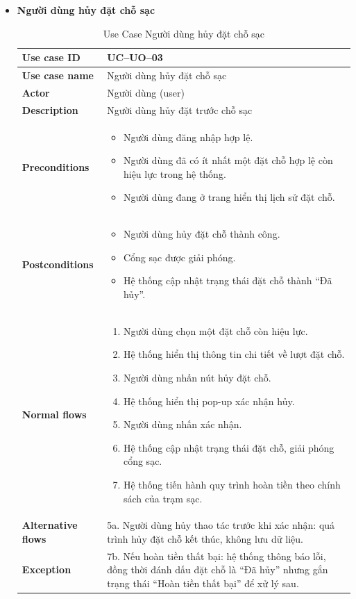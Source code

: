 \begin{itemize}
\item \textbf{Người dùng hủy đặt chỗ sạc}
\begin{longtable}{|m{}|m{}|}
          \caption{Use Case Người dùng hủy đặt chỗ sạc} \\
  \hline
  \textbf{Use case ID} & UC--UO--03 \\
  \hline
  \textbf{Use case name} & Người dùng hủy đặt chỗ sạc \\
  \hline
  \textbf{Actor} & Người dùng (user) \\
  \hline
  \textbf{Description} & Người dùng hủy đặt trước chỗ sạc \\
  \hline
  \textbf{Preconditions} &
  \begin{itemize}
    \item Người dùng đăng nhập hợp lệ.
    \item Người dùng đã có ít nhất một đặt chỗ hợp lệ còn hiệu lực trong hệ thống.
    \item Người dùng đang ở trang hiển thị lịch sử đặt chỗ.
  \end{itemize}\\
  \hline
  \textbf{Postconditions} &
  \begin{itemize}
    \item Người dùng hủy đặt chỗ thành công.
    \item Cổng sạc được giải phóng.
    \item Hệ thống cập nhật trạng thái đặt chỗ thành “Đã hủy”.
  \end{itemize}\\
  \hline
  \textbf{Normal flows} &
  \begin{enumerate}[label=\arabic*.]
    \item Người dùng chọn một đặt chỗ còn hiệu lực.
    \item Hệ thống hiển thị thông tin chi tiết về lượt đặt chỗ.
    \item Người dùng nhấn nút hủy đặt chỗ.
    \item Hệ thống hiển thị pop-up xác nhận hủy.
    \item Người dùng nhấn xác nhận.
    \item Hệ thống cập nhật trạng thái đặt chỗ, giải phóng cổng sạc.
    \item Hệ thống tiến hành quy trình hoàn tiền theo chính sách của trạm sạc.
  \end{enumerate}\\
  \hline
  \textbf{Alternative flows} &
  5a. Người dùng hủy thao tác trước khi xác nhận: quá trình hủy đặt chỗ kết thúc, không lưu dữ liệu.\\
  \hline
  \textbf{Exception} &
  7b. Nếu hoàn tiền thất bại: hệ thống thông báo lỗi, đồng thời đánh dấu đặt chỗ là “Đã hủy” nhưng gắn trạng thái “Hoàn tiền thất bại” để xử lý sau.\\
  \hline
  \end{longtable}
\end{itemize}


